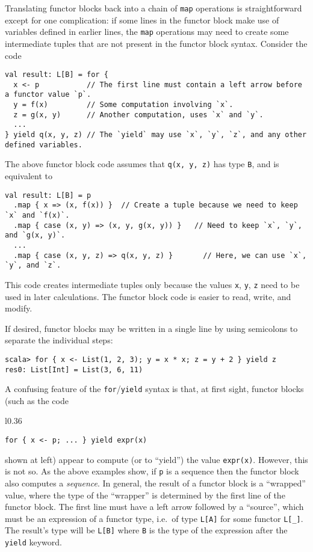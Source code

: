 Translating functor blocks back into a chain of \lstinline!map! operations
is straightforward except for one complication: if some lines in the
functor block make use of variables defined in earlier lines, the
\lstinline!map! operations may need to create some intermediate tuples
that are not present in the functor block syntax. Consider the code
\begin{lstlisting}
val result: L[B] = for {
  x <- p           // The first line must contain a left arrow before a functor value `p`.
  y = f(x)         // Some computation involving `x`.
  z = g(x, y)      // Another computation, uses `x` and `y`.
  ...
} yield q(x, y, z) // The `yield` may use `x`, `y`, `z`, and any other defined variables.
\end{lstlisting}
The above functor block code assumes that \lstinline!q(x, y, z)!
has type \lstinline!B!, and is equivalent to
\begin{lstlisting}
val result: L[B] = p
  .map { x => (x, f(x)) }  // Create a tuple because we need to keep `x` and `f(x)`.
  .map { case (x, y) => (x, y, g(x, y)) }   // Need to keep `x`, `y`, and `g(x, y)`.
  ...
  .map { case (x, y, z) => q(x, y, z) }       // Here, we can use `x`, `y`, and `z`.
\end{lstlisting}
This code creates intermediate tuples only because the values \lstinline!x!,
\lstinline!y!, \lstinline!z! need to be used in later calculations.
The functor block code is easier to read, write, and modify. 

If desired, functor blocks may be written in a single line by using
semicolons to separate the individual steps:
\begin{lstlisting}
scala> for { x <- List(1, 2, 3); y = x * x; z = y + 2 } yield z
res0: List[Int] = List(3, 6, 11)
\end{lstlisting}

A confusing feature of the \lstinline!for!/\lstinline!yield! syntax
is that, at first sight, functor blocks (such as the code\begin{wrapfigure}{l}{0.36\columnwidth}%
\vspace{-0.8\baselineskip}
\begin{lstlisting}
for { x <- p; ... } yield expr(x)
\end{lstlisting}

\vspace{-0.8\baselineskip}
\end{wrapfigure}%
 shown at left) appear to compute (or to \textsf{``}yield\textsf{''}) the value \lstinline!expr(x)!.
However, this is not so. As the above examples show, if \lstinline!p!
is a sequence then the functor block also computes a \emph{sequence}.
In general, the result of a functor block is a \textsf{``}wrapped\textsf{''} value,
where the type of the \textsf{``}wrapper\textsf{''} is determined by the first line
of the functor block. The first line must have a left arrow followed
by a \textsf{``}source\textsf{''}, which must be an expression
of a functor type, i.e.~of type \lstinline!L[A]! for some functor
\lstinline!L[_]!. The result\textsf{'}s type will be \lstinline!L[B]! where
\lstinline!B! is the type of the expression after the \lstinline!yield!
keyword.

